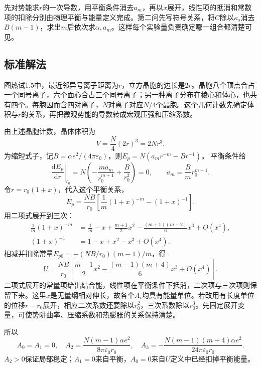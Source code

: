 \documentclass[UTF8,fontset=fandol,a4paper,11pt]{ctexart}
\begin{document}
先对势能求$r$的一次导数，用平衡条件消去$a_m$，再以$x$展开，线性项的抵消和常数项的扣除分别由物理平衡与能量定义完成。第二问先写符号关系，将$C$除以$\kappa_s$消去$B(m-1)$，求出$m$后依次求$\alpha,a_m$。这样每个实验量负责确定哪一组合都清楚可见。



\subsection*{标准解法}


图热试1.5中，最近邻异号离子距离为$r$，立方晶胞的边长是$2r$。晶胞八个顶点合占一个同号离子，六个面心合占三个同号离子；另一种离子分布在棱心和体心，也共有四个。每胞因而含四对离子，$N$对离子对应$N/4$个晶胞。这个几何计数先确定体积与$r$的关系，再把微观势能的导数转成宏观压强和压缩系数。

由上述晶胞计数，晶体体积为
\[
V=\frac N4(2r)^3=2Nr^3.
\]
为缩短式子，记$B=\alpha e^2/(4\pi\varepsilon_0)$，则$E_p=N(a_mr^{-m}-Br^{-1})$。
平衡条件给
\[
\left.\frac{\mathrm dE_p}{\mathrm dr}\right|_{r_0}
=N\left(-\frac{ma_m}{r_0^{m+1}}+\frac{B}{r_0^2}\right)=0,
\qquad
\boxed{a_m=\frac{B}{m}r_0^{m-1}}.
\]
令$r=r_0(1+x)$，代入这个平衡关系，
\[
E_p=\frac{NB}{r_0}
\left[\frac1m(1+x)^{-m}-(1+x)^{-1}\right].
\]
用二项式展开到三次：
\[
\begin{aligned}
\frac1m(1+x)^{-m}
&=\frac1m-x+\frac{m+1}{2}x^2
-\frac{(m+1)(m+2)}6x^3+O(x^4),\\
(1+x)^{-1}&=1-x+x^2-x^3+O(x^4).
\end{aligned}
\]
相减并扣除常量$E_{p0}=-(NB/r_0)(m-1)/m$，得
\[
U=\frac{NB}{r_0}\left[
\frac{m-1}{2}x^2-\frac{(m-1)(m+4)}6x^3+O(x^4)\right].
\]
二项式展开的常量项给出结合能，线性项在平衡条件下抵消，二次项与三次项则保留下来。这里$x$是无量纲相对伸长，故各个$A_i$均具有能量单位。若改用有长度单位的位移$r-r_0$展开，相应二次系数还要除以$r_0^2$，三次系数除以$r_0^3$。先固定展开变量，可使势阱曲率、压缩系数和热膨胀的关系保持清楚。

所以
\[
\boxed{A_0=A_1=0,\quad
A_2=\frac{N(m-1)\alpha e^2}{8\pi\varepsilon_0r_0},\quad
A_3=-\frac{N(m-1)(m+4)\alpha e^2}{24\pi\varepsilon_0r_0}}.
\]
$A_2>0$保证局部稳定；$A_1=0$来自平衡，$A_0=0$来自$U$定义中已经扣掉平衡能量。
\end{document}
